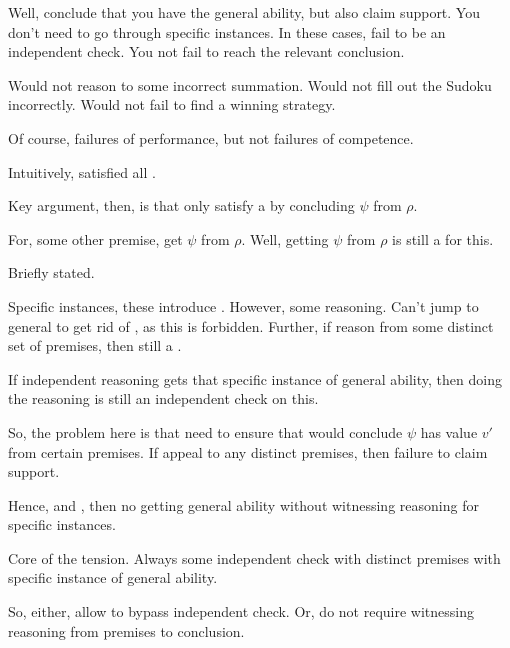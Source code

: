 \begin{note}
  Well, conclude that you have the general ability, but also claim support.
  You don't need to go through specific instances.
  In these cases, fail to be an independent check.
  You not fail to reach the relevant conclusion.

  Would not reason to some incorrect summation.
  Would not fill out the Sudoku incorrectly.
  Would not fail to find a winning strategy.

  Of course, failures of performance, but not failures of competence.

  Intuitively, satisfied all .
\end{note}


\begin{note}
  Key argument, then, is that only satisfy a \requ{} by concluding \(\psi\) from \(\rho\).

  For, some other premise, get \(\psi\) from \(\rho\).
  Well, getting \(\psi\) from \(\rho\) is still a \requ{} for this.
\end{note}

\begin{note}
  Briefly stated.

  Specific instances, these introduce \requ{}.
  However, some reasoning.
  Can't jump to general to get rid of \requ{}, as this is forbidden.
  Further, if reason from some distinct set of premises, then still a \requ{}.

  If independent reasoning gets that specific instance of general ability, then doing the reasoning is still an independent check on this.

  So, the problem here is that need to ensure that would conclude \(\psi\) has value \(v'\) from certain premises.
  If appeal to any distinct premises, then failure to claim support.

  Hence, \ESU{} and \ideaCS{}, then no getting general ability without witnessing reasoning for specific instances.

  Core of the tension.
  Always some independent check with distinct premises with specific instance of general ability.

  So, either, allow to bypass independent check.
  Or, do not require witnessing reasoning from premises to conclusion.
\end{note}

\subsubsection{\adB{}}
\label{sec:tension:adb}

